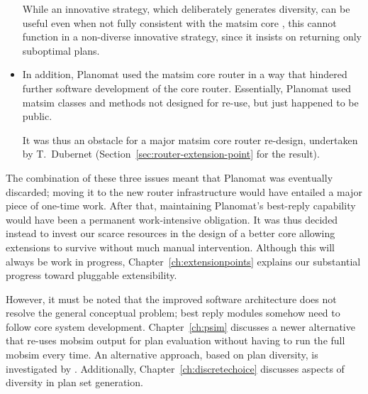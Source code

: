 \begin{itemize}
While an innovative strategy, which deliberately generates diversity, can be useful even when not fully consistent with the \gls{matsim} core \citep{NagelKickhoeferJoubert2014HeterogeneousVoTsPROCEDIA}, this cannot function in a non-diverse innovative strategy, since it insists on returning only suboptimal plans.
%
\item In addition, Planomat used the \gls{matsim} core router in a way that hindered further software development of the core router. Essentially, Planomat used \gls{matsim} classes and methods not designed for re-use, but just happened to be public.

It was thus an obstacle for a major \gls{matsim} core router re-design, undertaken by T.~Dubernet (Section~\ref{sec:router-extension-point} for the result).
\end{itemize}

The combination of these three issues meant that Planomat was eventually discarded; moving it to the new router infrastructure would have entailed a major piece of one-time work. After that, maintaining Planomat's best-reply capability would have been a permanent work-intensive obligation. It was thus decided instead to invest our scarce resources in the design of a better core allowing extensions to survive without much manual intervention. Although this will always be work in progress, Chapter~\ref{ch:extensionpoints} explains our substantial progress toward pluggable extensibility.

However, it must be noted that the improved software architecture does not resolve the general conceptual problem; best reply modules somehow need to follow core system development. Chapter~\ref{ch:psim} discusses a newer alternative that re-uses \gls{mobsim} output for plan evaluation without having to run the full \gls{mobsim} every time. An alternative approach, based on plan diversity, is investigated by \cite{NagelKickhoeferJoubert2014HeterogeneousVoTsPROCEDIA}. Additionally, Chapter~\ref{ch:discretechoice} discusses aspects of diversity in plan set generation.


